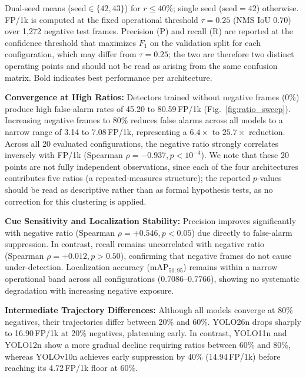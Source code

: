 \documentclass[conference]{IEEEtran}
\begin{document}
\begin{table}[htbp]
\par\vspace{-1pt}
{\footnotesize Dual-seed means ($\text{seed} \in \{42, 43\}$) for $r \le 40\%$; single seed ($\text{seed} = 42$) otherwise. FP/1k is computed at the fixed operational threshold $\tau = 0.25$ (NMS IoU $0.70$) over 1{,}272 negative test frames. Precision (P) and recall (R) are reported at the confidence threshold that maximizes $F_1$ on the validation split for each configuration, which may differ from $\tau = 0.25$; the two are therefore two distinct operating points and should not be read as arising from the same confusion matrix. Bold indicates best performance per architecture.\par}
\end{table}
\textbf{Convergence at High Ratios:} Detectors trained without negative frames (0\%) produce high false-alarm rates of 45.20 to 80.59\,FP/1k (Fig.~\ref{fig:ratio_sweep}). Increasing negative frames to 80\% reduces false alarms across all models to a narrow range of 3.14 to 7.08\,FP/1k, representing a $6.4\times$ to $25.7\times$ reduction. Across all 20 evaluated configurations, the negative ratio strongly correlates inversely with FP/1k (Spearman $\rho = -0.937, p < 10^{-4}$). We note that these 20 points are not fully independent observations, since each of the four architectures contributes five ratios (a repeated-measures structure); the reported $p$-values should be read as descriptive rather than as formal hypothesis tests, as no correction for this clustering is applied.

\textbf{Cue Sensitivity and Localization Stability:} Precision improves significantly with negative ratio (Spearman $\rho = +0.546, p < 0.05$) due directly to false-alarm suppression. In contrast, recall remains uncorrelated with negative ratio (Spearman $\rho = +0.012, p > 0.50$), confirming that negative frames do not cause under-detection. Localization accuracy ($\text{mAP}_{50:95}$) remains within a narrow operational band across all configurations (0.7086--0.7766), showing no systematic degradation with increasing negative exposure.

\textbf{Intermediate Trajectory Differences:} Although all models converge at 80\% negatives, their trajectories differ between 20\% and 60\%. YOLO26n drops sharply to 16.90\,FP/1k at 20\% negatives, plateauing early. In contrast, YOLO11n and YOLO12n show a more gradual decline requiring ratios between 60\% and 80\%, whereas YOLOv10n achieves early suppression by 40\% (14.94\,FP/1k) before reaching its 4.72\,FP/1k floor at 60\%.
\end{document}
